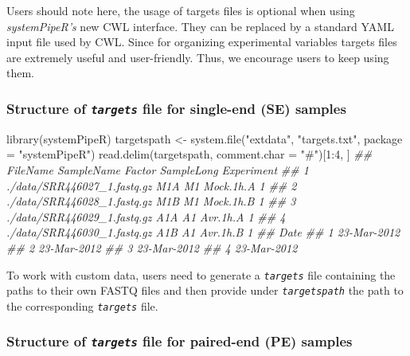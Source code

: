 \documentclass[14pt,]{article}
\newcommand{\hlnum}[1]{\textcolor[rgb]{0.816,0.125,0.439}{#1}}%
\newcommand{\hlstr}[1]{\textcolor[rgb]{0.251,0.627,0.251}{#1}}%
\newcommand{\hlcom}[1]{\textcolor[rgb]{0.502,0.502,0.502}{\textit{#1}}}%
\newcommand{\hlopt}[1]{\textcolor[rgb]{0,0,0}{#1}}%
\newcommand{\hlstd}[1]{\textcolor[rgb]{0.251,0.251,0.251}{#1}}%
\newcommand{\hlkwc}[1]{\textcolor[rgb]{0.251,0.251,0.251}{#1}}%
\newcommand{\hlkwd}[1]{\textcolor[rgb]{0.878,0.439,0.125}{#1}}%
\newenvironment{Shaded}{\begin{myshaded}}{\end{myshaded}}
\newcommand{\KeywordTok}[1]{\hlkwd{#1}}
\newcommand{\DataTypeTok}[1]{\hlkwc{#1}}
\newcommand{\DecValTok}[1]{\hlnum{#1}}
\newcommand{\StringTok}[1]{\hlstr{#1}}
\newcommand{\CommentTok}[1]{\hlcom{#1}}
\newcommand{\OperatorTok}[1]{\hlopt{#1}}
\newcommand{\NormalTok}[1]{\hlstd{#1}}
\begin{document}
Users should note here, the usage of targets files is optional when using
\emph{systemPipeR's} new CWL interface. They can be replaced by a standard YAML
input file used by CWL. Since for organizing experimental variables targets
files are extremely useful and user-friendly. Thus, we encourage users to keep using
them.

\hypertarget{structure-of-targets-file-for-single-end-se-samples}{%
\subsubsection{\texorpdfstring{Structure of \emph{\texttt{targets}} file for single-end (SE) samples}{Structure of targets file for single-end (SE) samples}}\label{structure-of-targets-file-for-single-end-se-samples}}

\begin{Shaded}
\begin{Highlighting}[]
\KeywordTok{library}\NormalTok{(systemPipeR)}
\NormalTok{targetspath <-}\StringTok{ }\KeywordTok{system.file}\NormalTok{(}\StringTok{"extdata"}\NormalTok{, }\StringTok{"targets.txt"}\NormalTok{, }\DataTypeTok{package =} \StringTok{"systemPipeR"}\NormalTok{)}
\KeywordTok{read.delim}\NormalTok{(targetspath, }\DataTypeTok{comment.char =} \StringTok{"#"}\NormalTok{)[}\DecValTok{1}\OperatorTok{:}\DecValTok{4}\NormalTok{, ]}
\CommentTok{##                      FileName SampleName Factor SampleLong Experiment}
\CommentTok{## 1 ./data/SRR446027_1.fastq.gz        M1A     M1  Mock.1h.A          1}
\CommentTok{## 2 ./data/SRR446028_1.fastq.gz        M1B     M1  Mock.1h.B          1}
\CommentTok{## 3 ./data/SRR446029_1.fastq.gz        A1A     A1   Avr.1h.A          1}
\CommentTok{## 4 ./data/SRR446030_1.fastq.gz        A1B     A1   Avr.1h.B          1}
\CommentTok{##          Date}
\CommentTok{## 1 23-Mar-2012}
\CommentTok{## 2 23-Mar-2012}
\CommentTok{## 3 23-Mar-2012}
\CommentTok{## 4 23-Mar-2012}
\end{Highlighting}
\end{Shaded}

To work with custom data, users need to generate a \emph{\texttt{targets}} file containing
the paths to their own FASTQ files and then provide under \emph{\texttt{targetspath}} the
path to the corresponding \emph{\texttt{targets}} file.

\hypertarget{structure-of-targets-file-for-paired-end-pe-samples}{%
\subsubsection{\texorpdfstring{Structure of \emph{\texttt{targets}} file for paired-end (PE) samples}{Structure of targets file for paired-end (PE) samples}}\label{structure-of-targets-file-for-paired-end-pe-samples}}
\end{document}
